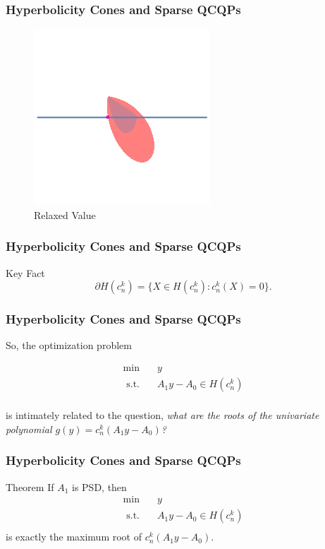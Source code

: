 \documentclass{beamer}
\newcommand{\st}{{\text{ s.t. }}}
\begin{document}
\begin{frame}
    \frametitle{Hyperbolicity Cones and Sparse QCQPs}
    \begin{figure}[htpb]
        \centering
        \includegraphics[width=0.6\linewidth]{relaxed.png}
        \caption{Relaxed Value}%
        \label{fig:comparison_line}
    \end{figure}
\end{frame}
\begin{frame}
    \frametitle{Hyperbolicity Cones and Sparse QCQPs}
    \begin{block}{Key Fact}
        \[\partial H(c_n^k) = \{X \in H(c_n^k) : c_n^k(X) = 0\}.\]
    \end{block}
\end{frame}
\begin{frame}
    \frametitle{Hyperbolicity Cones and Sparse QCQPs}
    So, the optimization problem 

    \begin{equation*}
        \begin{aligned}
            \min\quad & y\\
            \st & A_1y - A_0 \in H(c_n^k)\\
        \end{aligned}
    \end{equation*}

    is intimately related to the question, \emph{what are the roots of the univariate polynomial $g(y) = c_n^k(A_1y-A_0)$?}
\end{frame}
\begin{frame}
    \frametitle{Hyperbolicity Cones and Sparse QCQPs}
    \begin{block}{Theorem}
        If $A_1$ is PSD, then 
        \begin{equation*}
            \begin{aligned}
                \min\quad & y\\
                \st & A_1y - A_0 \in H(c_n^k)\\
            \end{aligned}
        \end{equation*}
        is exactly the maximum root of $c_n^k(A_1y-A_0)$.
    \end{block}
\end{frame}
\end{document}
